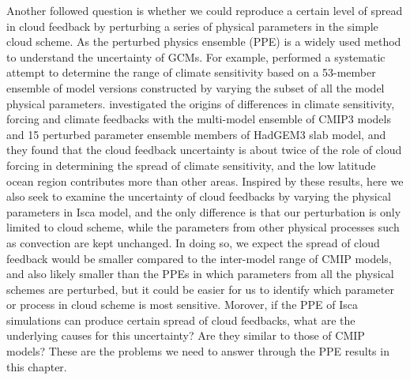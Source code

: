 Another followed question is whether we could reproduce a certain level of spread in cloud feedback by perturbing a series of physical parameters in the simple cloud scheme. As the perturbed physics ensemble (PPE) is a widely used method to understand the uncertainty of GCMs. For example, \cite{Murphy2004quantification} performed a systematic attempt to determine the range of climate sensitivity based on a 53-member ensemble of model versions constructed by varying the subset of all the model physical parameters. \cite{Webb2013origins} investigated the origins of differences in climate sensitivity, forcing and climate feedbacks with the multi-model ensemble of CMIP3 models and 15 perturbed parameter ensemble members of HadGEM3 slab model, and they found that the cloud feedback uncertainty is about twice of the role of cloud forcing in determining the spread of climate sensitivity, and the low latitude ocean region contributes more than other areas. Inspired by these results, here we also seek to examine the uncertainty of cloud feedbacks by varying the physical parameters in Isca model, and the only difference is that our perturbation is only limited to cloud scheme, while the parameters from other physical processes such as convection are kept unchanged. In doing so, we expect the spread of cloud feedback would be smaller compared to the inter-model range of CMIP models, and also likely smaller than the PPEs in which parameters from all the physical schemes are perturbed, but it could be easier for us to identify which parameter or process in cloud scheme is most sensitive. Morover, if the PPE of Isca simulations can produce certain spread of cloud feedbacks, what are the underlying causes for this uncertainty? Are they similar to those of CMIP models? These are the problems we need to answer through the PPE results in this chapter.



